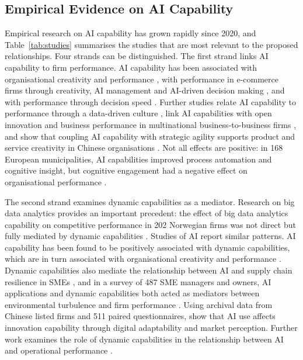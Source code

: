 \subsection{Empirical Evidence on AI Capability}
\label{sec:evidence}

Empirical research on AI capability has grown rapidly since 2020, and Table~\ref{tab:studies} summarises the studies that are most relevant to the proposed relationships. Four strands can be distinguished. The first strand links AI capability to firm performance. AI capability has been associated with organisational creativity and performance \parencite{mikalef2021ai}, with performance in e-commerce firms through creativity, AI management and AI-driven decision making \parencite{chen2022}, and with performance through decision speed \parencite{neiroukh2025}. Further studies relate AI capability to performance through a data-driven culture \parencite{fossowamba2024}, link AI capabilities with open innovation and business performance in multinational business-to-business firms \parencite{sahoo2024}, and show that coupling AI capability with strategic agility supports product and service creativity in Chinese organisations \parencite{ameen2024}. Not all effects are positive: in 168 European municipalities, AI capabilities improved process automation and cognitive insight, but cognitive engagement had a negative effect on organisational performance \parencite{mikalef2023public}.

The second strand examines dynamic capabilities as a mediator. Research on big data analytics provides an important precedent: the effect of big data analytics capability on competitive performance in 202 Norwegian firms was not direct but fully mediated by dynamic capabilities \parencite{mikalef2020}. Studies of AI report similar patterns. AI capability has been found to be positively associated with dynamic capabilities, which are in turn associated with organisational creativity and performance \parencite{almheiri2024, almheiri2025}. Dynamic capabilities also mediate the relationship between AI and supply chain resilience in SMEs \parencite{le2024}, and in a survey of 487 SME managers and owners, AI applications and dynamic capabilities both acted as mediators between environmental turbulence and firm performance \parencite{aldhaheri2024}. Using archival data from Chinese listed firms and 511 paired questionnaires, \textcite{gao2025} show that AI use affects innovation capability through digital adaptability and market perception. Further work examines the role of dynamic capabilities in the relationship between AI and operational performance \parencite{wong2025}.

